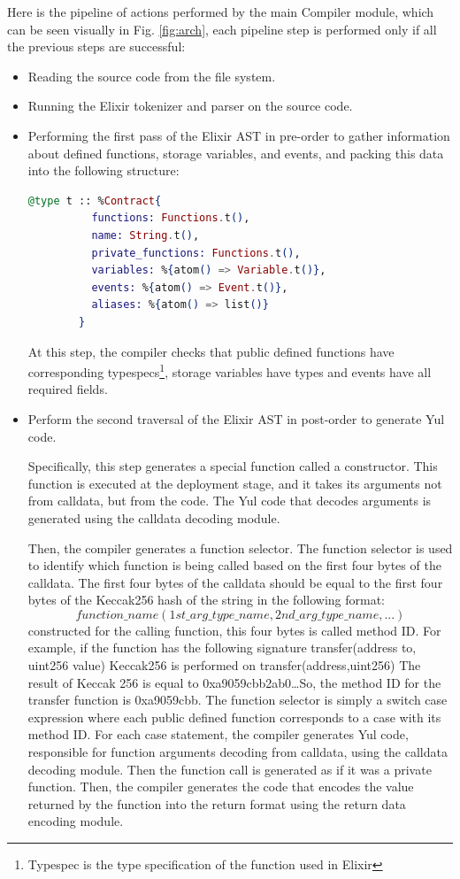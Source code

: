 Here is the pipeline of actions performed by the main Compiler module, which can be seen visually in Fig. \ref{fig:arch}, each pipeline step is performed only if all the previous steps are successful:

\begin{itemize}
    \item Reading the source code from the file system.
    \item Running the Elixir tokenizer and parser on the source code.
    \item Performing the first pass of the Elixir AST in pre-order to gather information about defined functions, storage variables, and events, and packing this data into the following structure:
    
    \begin{lstlisting}[caption={Contract structure}, language=elixir, label={lst:contract_structure}]
      @type t :: %Contract{
          functions: Functions.t(),
          name: String.t(),
          private_functions: Functions.t(),
          variables: %{atom() => Variable.t()},
          events: %{atom() => Event.t()},
          aliases: %{atom() => list()}
        }
    \end{lstlisting}
    
    At this step, the compiler checks that public defined functions have corresponding typespecs\footnote{Typespec is the type specification of the function used in Elixir}, storage variables have types and events have all required fields.

    \item Perform the second traversal of the Elixir AST in post-order to generate Yul code.
    
    Specifically, this step generates a special function called a constructor. This function is executed at the deployment stage, and it takes its arguments not from calldata, but from the code. The Yul code that decodes arguments is generated using the calldata decoding module.

    Then, the compiler generates a function selector. The function selector is used to identify which function is being called based on the first four bytes of the calldata. The first four bytes of the calldata should be equal to the first four bytes of the Keccak256 hash of the string in the following format:
    $$function\_name(1st\_arg\_type\_name,2nd\_arg\_type\_name,...)$$
    constructed for the calling function, this four bytes is called method ID. For example, if the function has the following signature transfer(address to, uint256 value) Keccak256 is performed on transfer(address,uint256) The result of Keccak 256 is equal to 0xa9059cbb2ab0\dots So, the method ID for the transfer function is 0xa9059cbb. The function selector is simply a switch case expression where each public defined function corresponds to a case with its method ID. For each case statement, the compiler generates Yul code, responsible for function arguments decoding from calldata, using the calldata decoding module. Then the function call is generated as if it was a private function. Then, the compiler generates the code that encodes the value returned by the function into the return format using the return data encoding module.


\end{itemize}
